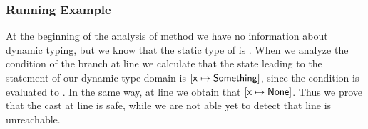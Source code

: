 \documentclass{llncs}
\begin{document}
\subsubsection{Running Example}
At the beginning of the analysis of method  we have no information about dynamic typing, but we know that the static type of  is . When we analyze the condition of the  branch at line  we calculate that the state leading to the  statement of our dynamic type domain is $[\mathsf{x} \mapsto \mathsf{Something}]$, since the condition is evaluated to \true. In the same way, at line  we obtain that $[\mathsf{x} \mapsto \mathsf{None}]$. Thus we prove that the cast at line  is safe, while we are not able yet to detect that line  is unreachable.
\end{document}
